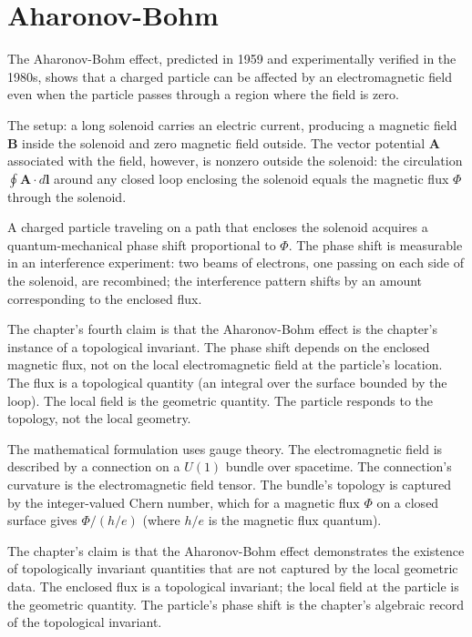 \section{Aharonov-Bohm}
\label{se:aharonov-bohm}

The Aharonov-Bohm effect, predicted in 1959 and experimentally
verified in the 1980s, shows that a charged particle can be
affected by an electromagnetic field even when the particle passes
through a region where the field is zero.

The setup: a long solenoid carries an electric current, producing
a magnetic field $\mathbf{B}$ inside the solenoid and zero magnetic
field outside. The vector potential $\mathbf{A}$ associated with
the field, however, is nonzero outside the solenoid: the
circulation $\oint \mathbf{A} \cdot d\mathbf{l}$ around any closed
loop enclosing the solenoid equals the magnetic flux $\Phi$ through
the solenoid.

A charged particle traveling on a path that encloses the solenoid
acquires a quantum-mechanical phase shift proportional to $\Phi$.
The phase shift is measurable in an interference experiment: two
beams of electrons, one passing on each side of the solenoid, are
recombined; the interference pattern shifts by an amount
corresponding to the enclosed flux.

The chapter's fourth claim is that the Aharonov-Bohm effect is the
chapter's instance of a topological invariant. The phase shift
depends on the enclosed magnetic flux, not on the local
electromagnetic field at the particle's location. The flux is a
topological quantity (an integral over the surface bounded by the
loop). The local field is the geometric quantity. The particle
responds to the topology, not the local geometry.

The mathematical formulation uses gauge theory. The
electromagnetic field is described by a connection on a $U(1)$
bundle over spacetime. The connection's curvature is the
electromagnetic field tensor. The bundle's topology is captured
by the integer-valued Chern number, which for a magnetic flux
$\Phi$ on a closed surface gives $\Phi / (h/e)$ (where $h/e$ is
the magnetic flux quantum).

The chapter's claim is that the Aharonov-Bohm effect demonstrates
the existence of topologically invariant quantities that are not
captured by the local geometric data. The enclosed flux is a
topological invariant; the local field at the particle is the
geometric quantity. The particle's phase shift is the
chapter's algebraic record of the topological invariant.

